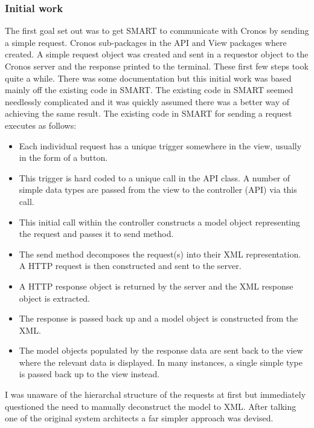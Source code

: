 \documentclass[a4paper, 11pt, titlepage]{article}
\begin{document}
\subsubsection{Initial work} 
The first goal set out was to get SMART to communicate with Cronos by sending a simple request. Cronos sub-packages in the API and View packages where created. A simple request object was created and sent in a requestor object to the Cronos server and the response printed to the terminal. These first few steps took quite a while. There was some documentation but this initial work was based mainly off the existing code in SMART. The existing code in SMART seemed needlessly complicated and it was quickly assumed there was a better way of achieving the same result. The existing code in SMART for sending a request executes as follows: 
\begin{itemize} 
\item Each individual request has a unique trigger somewhere in the view, usually in the form of a button. 
\item This trigger is hard coded to a unique call in the API class. A number of simple data types are passed from the view to the controller (API) via this call. 
\item This initial call within the controller constructs a model object representing the request and passes it to send method. 
\item The send method decomposes the request(s) into their XML representation. A HTTP request is then constructed and sent to the server. 
\item A HTTP response object is returned by the server and the XML response object is extracted. 
\item The response is passed back up and a model object is constructed from the XML. 
\item The model objects populated by the response data are sent back to the view where the relevant data is displayed. In many instances, a single simple type is passed back up to the view instead. 
\end{itemize} 
I was unaware of the hierarchal structure of the requests at first but immediately questioned the need to manually deconstruct the model to XML. After talking one of the original system architects a far simpler approach was devised. 
\end{document}

